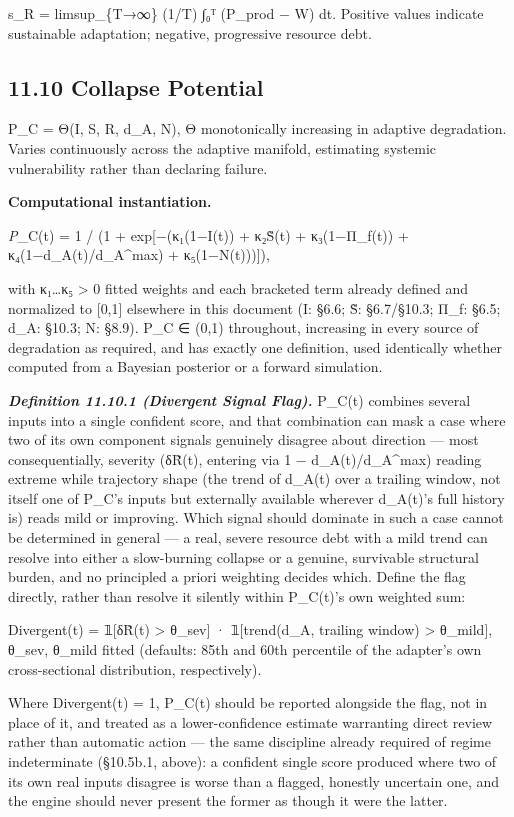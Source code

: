 \documentclass[
]{article}
\begin{document}
s\_R = limsup\_\{T→∞\} (1/T) ∫₀ᵀ (P\_prod − W) dt. Positive values
indicate sustainable adaptation; negative, progressive resource debt.

\hypertarget{collapse-potential}{%
\subsection{11.10 Collapse Potential}\label{collapse-potential}}

P\_C = Θ(I, S, R, d\_A, N), Θ monotonically increasing in adaptive
degradation. Varies continuously across the adaptive manifold,
estimating systemic vulnerability rather than declaring failure.

\textbf{Computational instantiation.}

\emph{P}\_C(t) = 1 / (1 + exp{[}−(κ₁(1−I(t)) + κ₂S̃(t) + κ₃(1−Π\_f(t)) +
κ₄(1−d\_A(t)/d\_A\^{}max) + κ₅(1−N(t))){]}),

with κ₁\ldots κ₅ \textgreater{} 0 fitted weights and each bracketed term
already defined and normalized to {[}0,1{]} elsewhere in this document
(I: §6.6; S̃: §6.7/§10.3; Π\_f: §6.5; d\_A: §10.3; N: §8.9). P\_C ∈ (0,1)
throughout, increasing in every source of degradation as required, and
has exactly one definition, used identically whether computed from a
Bayesian posterior or a forward simulation.

\emph{\textbf{Definition 11.10.1 (Divergent Signal Flag).}} P\_C(t)
combines several inputs into a single confident score, and that
combination can mask a case where two of its own component signals
genuinely disagree about direction --- most consequentially, severity
(δR̃(t), entering via 1 − d\_A(t)/d\_A\^{}max) reading extreme while
trajectory shape (the trend of d\_A(t) over a trailing window, not
itself one of P\_C's inputs but externally available wherever d\_A(t)'s
full history is) reads mild or improving. Which signal should dominate
in such a case cannot be determined in general --- a real, severe
resource debt with a mild trend can resolve into either a slow-burning
collapse or a genuine, survivable structural burden, and no principled a
priori weighting decides which. Define the flag directly, rather than
resolve it silently within P\_C(t)'s own weighted sum:

Divergent(t) = 𝟙{[}δR̃(t) \textgreater{} θ\_sev{]} · 𝟙{[}trend(d\_A,
trailing window) \textgreater{} θ\_mild{]}, θ\_sev, θ\_mild fitted
(defaults: 85th and 60th percentile of the adapter's own cross-sectional
distribution, respectively).

Where Divergent(t) = 1, P\_C(t) should be reported alongside the flag,
not in place of it, and treated as a lower-confidence estimate
warranting direct review rather than automatic action --- the same
discipline already required of regime indeterminate (§10.5b.1, above): a
confident single score produced where two of its own real inputs
disagree is worse than a flagged, honestly uncertain one, and the engine
should never present the former as though it were the latter.
\end{document}

